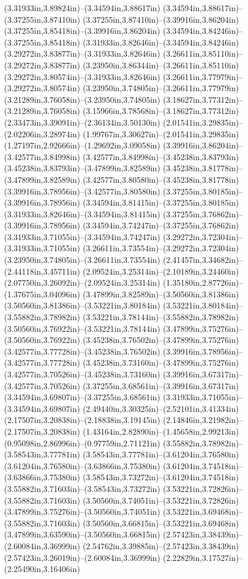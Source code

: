 (3.31933in,3.89824in)--(3.34594in,3.88617in) (3.34594in,3.88617in)--(3.37255in,3.87410in) (3.37255in,3.87410in)--(3.39916in,3.86204in) (3.37255in,3.85418in)--(3.39916in,3.86204in) (3.34594in,3.84246in)--(3.37255in,3.85418in) (3.31933in,3.82646in)--(3.34594in,3.84246in) (3.29272in,3.83877in)--(3.31933in,3.82646in) (3.26611in,3.85110in)--(3.29272in,3.83877in) (3.23950in,3.86344in)--(3.26611in,3.85110in) (3.29272in,3.80574in)--(3.31933in,3.82646in) (3.26611in,3.77979in)--(3.29272in,3.80574in) (3.23950in,3.74805in)--(3.26611in,3.77979in) (3.21289in,3.76058in)--(3.23950in,3.74805in) (3.18627in,3.77312in)--(3.21289in,3.76058in) (3.15966in,3.78568in)--(3.18627in,3.77312in) (2.33473in,3.39091in)--(2.36134in,3.50130in) (2.01541in,3.29835in)--(2.02206in,3.28974in) (1.99767in,3.30627in)--(2.01541in,3.29835in) (1.27197in,2.92666in)--(1.29692in,3.09058in) (3.39916in,3.86204in)--(3.42577in,3.84998in) (3.42577in,3.84998in)--(3.45238in,3.83793in) (3.45238in,3.83793in)--(3.47899in,3.82589in) (3.45238in,3.81778in)--(3.47899in,3.82589in) (3.42577in,3.80580in)--(3.45238in,3.81778in) (3.39916in,3.78956in)--(3.42577in,3.80580in) (3.37255in,3.80185in)--(3.39916in,3.78956in) (3.34594in,3.81415in)--(3.37255in,3.80185in) (3.31933in,3.82646in)--(3.34594in,3.81415in) (3.37255in,3.76862in)--(3.39916in,3.78956in) (3.34594in,3.74247in)--(3.37255in,3.76862in) (3.31933in,3.71055in)--(3.34594in,3.74247in) (3.29272in,3.72304in)--(3.31933in,3.71055in) (3.26611in,3.73554in)--(3.29272in,3.72304in) (3.23950in,3.74805in)--(3.26611in,3.73554in) (2.41457in,3.34682in)--(2.44118in,3.45711in) (2.09524in,3.25314in)--(2.10189in,3.24460in) (2.07750in,3.26092in)--(2.09524in,3.25314in) (1.35180in,2.87726in)--(1.37675in,3.04096in) (3.47899in,3.82589in)--(3.50560in,3.81386in) (3.50560in,3.81386in)--(3.53221in,3.80184in) (3.53221in,3.80184in)--(3.55882in,3.78982in) (3.53221in,3.78144in)--(3.55882in,3.78982in) (3.50560in,3.76922in)--(3.53221in,3.78144in) (3.47899in,3.75276in)--(3.50560in,3.76922in) (3.45238in,3.76502in)--(3.47899in,3.75276in) (3.42577in,3.77728in)--(3.45238in,3.76502in) (3.39916in,3.78956in)--(3.42577in,3.77728in) (3.45238in,3.73160in)--(3.47899in,3.75276in) (3.42577in,3.70526in)--(3.45238in,3.73160in) (3.39916in,3.67317in)--(3.42577in,3.70526in) (3.37255in,3.68561in)--(3.39916in,3.67317in) (3.34594in,3.69807in)--(3.37255in,3.68561in) (3.31933in,3.71055in)--(3.34594in,3.69807in) (2.49440in,3.30325in)--(2.52101in,3.41334in) (2.17507in,3.20838in)--(2.18838in,3.19145in) (2.14846in,3.21982in)--(2.17507in,3.20838in) (1.43164in,2.82890in)--(1.45658in,2.99213in) (0.95098in,2.86996in)--(0.97759in,2.71121in) (3.55882in,3.78982in)--(3.58543in,3.77781in) (3.58543in,3.77781in)--(3.61204in,3.76580in) (3.61204in,3.76580in)--(3.63866in,3.75380in) (3.61204in,3.74518in)--(3.63866in,3.75380in) (3.58543in,3.73272in)--(3.61204in,3.74518in) (3.55882in,3.71603in)--(3.58543in,3.73272in) (3.53221in,3.72826in)--(3.55882in,3.71603in) (3.50560in,3.74051in)--(3.53221in,3.72826in) (3.47899in,3.75276in)--(3.50560in,3.74051in) (3.53221in,3.69468in)--(3.55882in,3.71603in) (3.50560in,3.66815in)--(3.53221in,3.69468in) (3.47899in,3.63590in)--(3.50560in,3.66815in) (2.57423in,3.38439in)--(2.60084in,3.36999in) (2.54762in,3.39885in)--(2.57423in,3.38439in) (2.57423in,3.26019in)--(2.60084in,3.36999in) (2.22829in,3.17527in)--(2.25490in,3.16406in) 